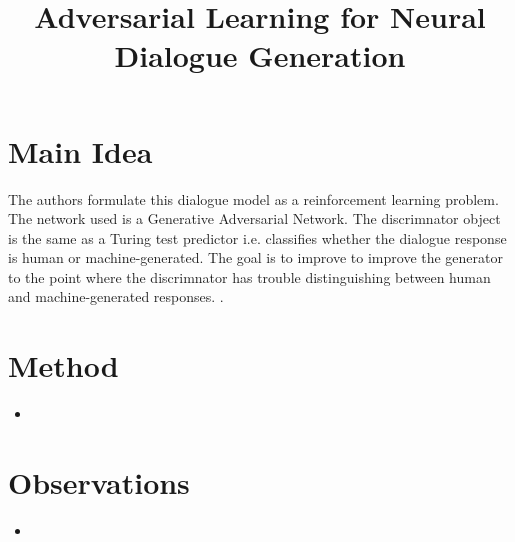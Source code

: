 \documentclass[12pt]{scrartcl}
\begin{document}
\title{Adversarial Learning for Neural Dialogue Generation}
\author{}
\date{}
\maketitle

\section{Main Idea}
  The authors formulate this dialogue model as a reinforcement learning problem. The network used is a Generative Adversarial Network. The discrimnator object is the same as a Turing test predictor i.e. classifies whether the dialogue response is human or machine-generated. The goal is to improve to improve the generator to the point where the discrimnator has trouble distinguishing between human and machine-generated responses. \cite{li2017adversarial}.

\section{Method}
  \begin{itemize}
    \item 
  \end{itemize}

\section{Observations}
  \begin{itemize}
    \item 
  \end{itemize}



\end{document}
